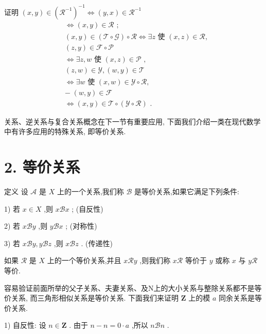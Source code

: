 证明 $\left( {x,y}\right)  \in  {\left( {\mathcal{R}}^{-1}\right) }^{-1} \Leftrightarrow  \left( {y,x}\right)  \in  {\mathcal{R}}^{-1}$
\begin{align*}
	&\Leftrightarrow  \left( {x,y}\right)  \in  \mathcal{R}\text{ ; }\\
	&\left( {x,y}\right)  \in  \left( {\mathcal{T} \circ  \mathcal{G}}\right)  \circ  \mathcal{R} \Leftrightarrow  \exists z\text{ 使 }\left( {x,z}\right)  \in  \mathcal{R},\\
	&\left( {z,y}\right)  \in  \mathcal{F} \circ  \mathcal{P}\\
	&\Leftrightarrow  \exists z,w\text{ 使 }\left( {x,z}\right)  \in  \mathcal{P}\text{ , }\\
	&\left( {z,w}\right)  \in  \mathcal{Y},\left( {w,y}\right)  \in  \mathcal{T}\\
	&\Leftrightarrow  \exists w\text{ 使 }\left( {x,w}\right)  \in  \mathcal{Y} \circ  \mathcal{R},\\
	&- \;\left( {w,y}\right)  \in  \mathcal{F}\\
	&\Leftrightarrow  \left( {x,y}\right)  \in  \mathcal{T} \circ  \left( {\mathcal{Y} \circ  \mathcal{R}}\right) \text{ . }
\end{align*}

关系、逆关系与复合关系概念在下一节有重要应用, 下面我们介绍一类在现代数学中有许多应用的特殊关系, 即等价关系.

\section*{2. 等价关系}

定义 设 $\mathcal{A}$ 是 $X$ 上的一个关系,我们称 $\mathcal{B}$ 是等价关系,如果它满足下列条件:

1) 若 $x \in  X$ ,则 $x\mathcal{B}x$ ; (自反性)

2) 若 $x\mathcal{B}y$ ,则 $y\mathcal{B}x$ ; (对称性)

3) 若 $x\mathcal{B}y,y\mathcal{B}z$ ,则 $x\mathcal{B}z$ . (传递性)

如果 $\mathcal{R}$ 是 $X$ 上的一个等价关系,并且 $x\mathcal{R}y$ ,则我们称 $x\mathcal{R}$ 等价于 $y$ 或称 $x$ 与 $y\mathcal{R}$ 等价.

容易验证前面所举的父子关系、夫妻关系、及N上的大小关系与整除关系都不是等价关系, 而三角形相似关系是等价关系. 下面我们来证明 $\mathbf{Z}$ 上的模 $a$ 同余关系是等价关系.

1) 自反性: 设 $n \in  \mathbf{Z}$ . 由于 $n - n = 0 \cdot  a$ ,所以 $n\mathcal{B}n$ .


